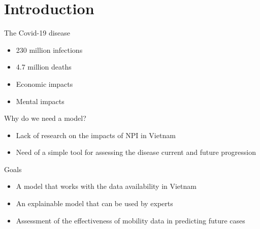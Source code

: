 \section{Introduction}

\begin{frame}{The Covid-19 disease}
\begin{itemize}
    \item 230 million infections
    \item 4.7 million deaths
    \item Economic impacts
    \item Mental impacts
\end{itemize}
\end{frame}

\begin{frame}{Why do we need a model?}
\begin{itemize}
    \item Lack of research on the impacts of \gls{NPI} in Vietnam
    \item Need of a simple tool for assessing the disease current and future progression
\end{itemize}
\end{frame}

\begin{frame}{Goals}
\begin{itemize}
    \item A model that works with the data availability in Vietnam
    \item An explainable model that can be used by experts
    \item Assessment of the effectiveness of mobility data in predicting future cases
\end{itemize}
\end{frame}
